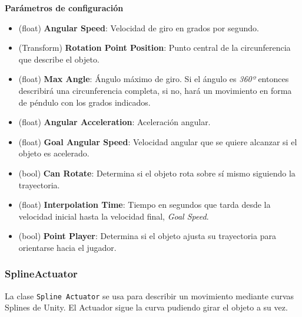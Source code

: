 \textbf{Parámetros de configuración}
\begin{itemize}
	\item (float) \textbf{Angular Speed}: Velocidad de giro en grados por segundo.
	\item (Transform) \textbf{Rotation Point Position}: Punto central de la circunferencia que describe el objeto.
	\item (float) \textbf{Max Angle}: Ángulo máximo de giro. Si el ángulo es \textit{360º} entonces describirá una circunferencia completa, si no, hará un movimiento en forma de péndulo con los grados indicados.
	\item (float) \textbf{Angular Acceleration}: Aceleración angular.
	\item (float) \textbf{Goal Angular Speed}: Velocidad angular que se quiere alcanzar si el objeto es acelerado.
	\item (bool) \textbf{Can Rotate}: Determina si el objeto rota sobre sí mismo siguiendo la trayectoria.
	\item (float)\textbf{ Interpolation Time}: Tiempo en segundos que tarda desde la velocidad inicial hasta la velocidad final, \textit{Goal Speed}.
	\item (bool) \textbf{Point Player}: Determina si el objeto ajusta su trayectoria para orientarse hacia el jugador.
\end{itemize}

\subsubsection{SplineActuator}
La clase \texttt{Spline Actuator} se usa para describir un movimiento mediante curvas Splines de Unity. El Actuador sigue la curva pudiendo girar el objeto a su vez.\\

